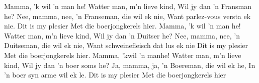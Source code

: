 \beginverse*
Mamma, 'k wil 'n man he!
Watter man, m'n lieve kind,
Wil jy dan 'n Fransman he?
Nee, mamma, nee,
'n Franseman, die wil ek nie,
Want parlez-vous versta ek nie.
Dit is my plesier
Met die boerjongkerels hier.
\endverse
\beginverse*
Mamma, 'k wil 'n man he!
Watter man, m'n lieve kind,
Wil jy dan 'n Duitser he?
Nee, mamma, nee,
'n Duitseman, die wil ek nie,
Want schweinefleisch dat lus ek nie
Dit is my plesier
Met die boerjongkerels hier.
\endverse
\beginverse*
Mamma, 'kwil 'n manhe!
Watter man, m'n lieve kind,
Wil jy dan 'n boer soms he?
Ja, mamma, ja,
'n Boereman, die wil ek he,
In 'n boer syn arme wil ek le.
Dit is my plesier
Met die boerjongkerels hier
\endverse
\endsong